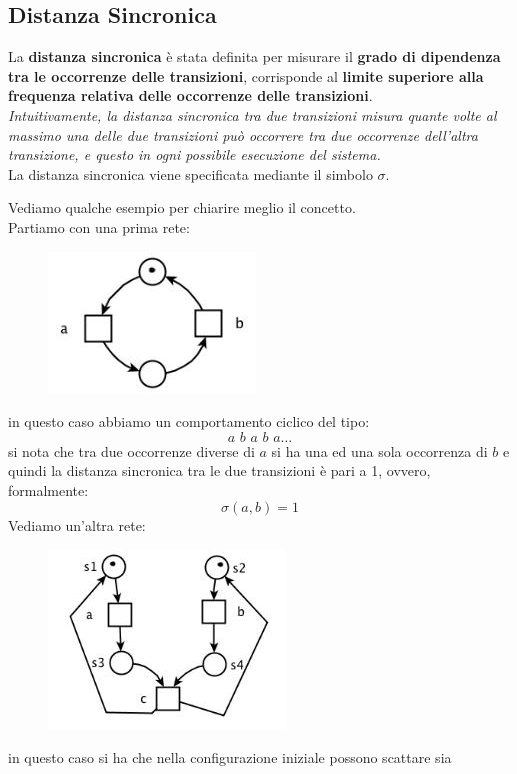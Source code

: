 \documentclass[a4paper,12pt, oneside]{book}
\begin{document}
\subsection{Distanza Sincronica}
La \textbf{distanza sincronica} è stata definita per misurare il \textbf{grado
  di dipendenza tra le occorrenze delle transizioni}, corrisponde al 
\textbf{limite superiore alla frequenza relativa delle occorrenze delle
  transizioni}. \\
\textit{Intuitivamente, la distanza sincronica tra due transizioni misura quante
  volte al massimo una delle due transizioni può occorrere tra due occorrenze
  dell’altra transizione, e questo in ogni possibile esecuzione del sistema.}\\
La distanza sincronica viene specificata mediante il simbolo $\sigma$.
\begin{esempio}
  Vediamo qualche esempio per chiarire meglio il concetto.
  \\
  Partiamo con una prima rete:
  \begin{figure}[H]
    \centering
    \includegraphics[scale = 0.6]{img/ds.jpg}
  \end{figure}
  in questo caso abbiamo un comportamento ciclico del tipo:
  \[a\,\,b\,\,a\,\,b\,\,a\ldots\]
  si nota che tra due occorrenze diverse di $a$ si ha una ed una sola occorrenza
  di $b$ e quindi la distanza sincronica tra le due transizioni è pari a 1,
  ovvero, formalmente:
  \[\sigma(a,b)=1\]
  Vediamo un'altra rete:
  \begin{figure}[H]
    \centering
    \includegraphics[scale = 0.6]{img/ds2.jpg}
  \end{figure}
  in questo caso si ha che nella configurazione iniziale possono scattare sia

\end{esempio}
\end{document}
